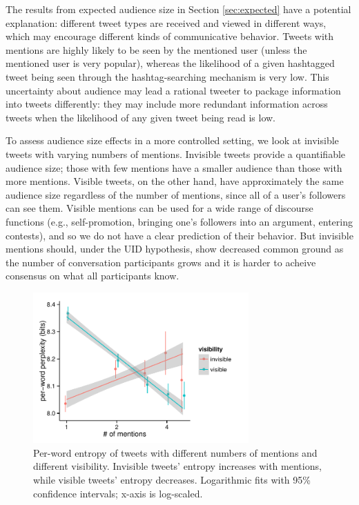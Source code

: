 \documentclass[11pt,letterpaper]{article}
\begin{document}
The results from expected audience size in Section \ref{sec:expected} have a potential explanation: different tweet types are received and viewed in different ways, which may encourage different kinds of communicative behavior.  Tweets with mentions are highly likely to be seen by the mentioned user (unless the mentioned user is very popular), whereas the likelihood of a given hashtagged tweet being seen through the hashtag-searching mechanism is very low.  This uncertainty about audience may lead a rational tweeter to package information into tweets differently: they may include more redundant information across tweets when the likelihood of any given tweet being read is low.

To assess audience size effects in a more controlled setting, we look at invisible tweets with varying numbers of mentions.  Invisible tweets provide a quantifiable audience size; those with few mentions have a smaller audience than those with more mentions.  Visible tweets, on the other hand, have approximately the same audience size regardless of the number of mentions, since all of a user's followers can see them. Visible mentions can be used for a wide range of discourse functions (e.g., self-promotion, bringing one's followers into an argument, entering contests), and so we do not have a clear prediction of their behavior. But invisible mentions should, under the UID hypothesis, show decreased common ground as the number of conversation participants grows and it is harder to acheive consensus on what all participants know.

\begin{figure}[t]
 \centering
  \includegraphics[width=3.25in]{figures/cmcl-mentions-pw2.pdf}
 \caption{Per-word entropy of tweets with different numbers of mentions and different visibility.  Invisible tweets' entropy increases with mentions, while visible tweets' entropy decreases. Logarithmic fits with 95\% confidence intervals; x-axis is log-scaled.}\label{fig:mentions}\vspace*{-.5em}
\end{figure}
\end{document}
